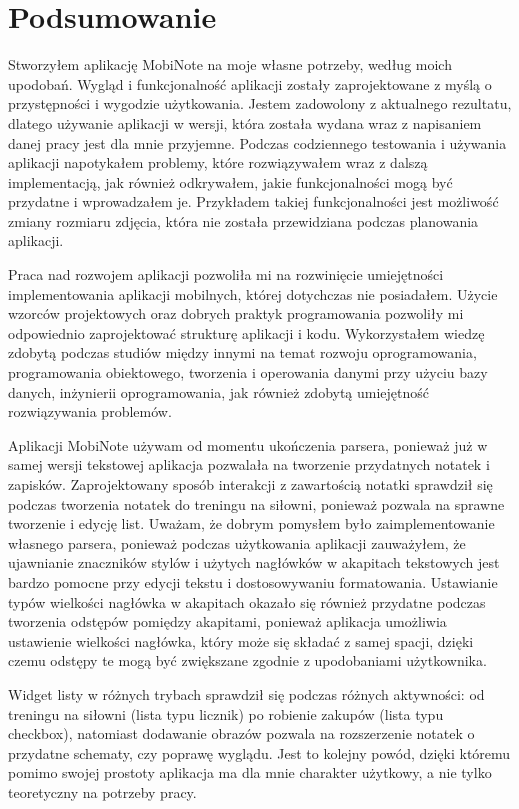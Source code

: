 

\chapter{Podsumowanie}

Stworzyłem aplikację MobiNote na moje własne potrzeby, według moich upodobań. Wygląd i funkcjonalność aplikacji zostały zaprojektowane z myślą o przystępności i wygodzie użytkowania. Jestem zadowolony z aktualnego rezultatu, dlatego używanie aplikacji w wersji, która została wydana wraz z napisaniem danej pracy jest dla mnie przyjemne. Podczas codziennego testowania i używania aplikacji napotykałem problemy, które rozwiązywałem wraz z dalszą implementacją, jak również odkrywałem, jakie funkcjonalności mogą być przydatne i wprowadzałem je. Przykładem takiej funkcjonalności jest możliwość zmiany rozmiaru zdjęcia, która nie została przewidziana podczas planowania aplikacji.

Praca nad rozwojem aplikacji pozwoliła mi na rozwinięcie umiejętności implementowania aplikacji mobilnych, której dotychczas nie posiadałem. Użycie wzorców projektowych oraz dobrych praktyk programowania pozwoliły mi odpowiednio zaprojektować strukturę aplikacji i kodu. Wykorzystałem wiedzę zdobytą podczas studiów między innymi na temat rozwoju oprogramowania, programowania obiektowego, tworzenia i operowania danymi przy użyciu bazy danych, inżynierii oprogramowania, jak również zdobytą umiejętność rozwiązywania problemów.

Aplikacji MobiNote używam od momentu ukończenia parsera, ponieważ już w samej wersji tekstowej aplikacja pozwalała na tworzenie przydatnych notatek i zapisków.
Zaprojektowany sposób interakcji z zawartością notatki sprawdził się podczas tworzenia notatek do treningu na siłowni, ponieważ pozwala na sprawne tworzenie i edycję list. Uważam, że dobrym pomysłem było zaimplementowanie własnego parsera, ponieważ podczas użytkowania aplikacji zauważyłem, że ujawnianie znaczników stylów i użytych nagłówków w akapitach tekstowych jest bardzo pomocne przy edycji tekstu i dostosowywaniu formatowania. Ustawianie typów wielkości nagłówka w akapitach okazało się również przydatne podczas tworzenia odstępów pomiędzy akapitami, ponieważ aplikacja umożliwia ustawienie wielkości nagłówka, który może się składać z samej spacji, dzięki czemu odstępy te mogą być zwiększane zgodnie z upodobaniami użytkownika.

Widget listy w różnych trybach sprawdził się podczas różnych aktywności: od treningu na siłowni (lista typu licznik) po robienie zakupów (lista typu checkbox), natomiast dodawanie obrazów pozwala na rozszerzenie notatek o przydatne schematy, czy poprawę wyglądu. Jest to kolejny powód, dzięki któremu pomimo swojej prostoty aplikacja ma dla mnie charakter użytkowy, a nie tylko teoretyczny na potrzeby pracy.

